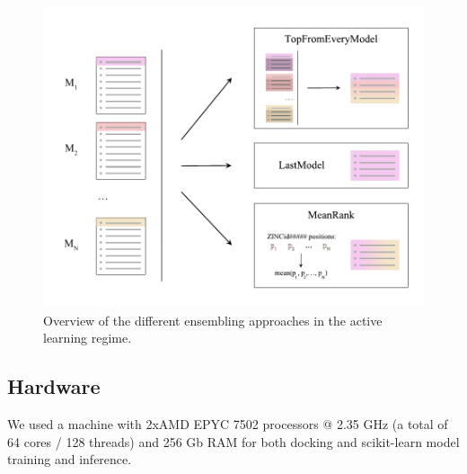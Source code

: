 \begin{figure}[ht]
\centering
\includegraphics[width=1.0\textwidth]{figures/Figure_2_v4.pdf}
\caption{Overview of the different ensembling approaches in the active learning regime.}
\label{fig:fig_2_scheme}
\end{figure}


\subsection{Hardware}
We used a machine with 2xAMD EPYC 7502 processors @ 2.35 GHz (a total of 64 cores / 128 threads) and 256 Gb RAM for both docking and scikit-learn model training and inference.
